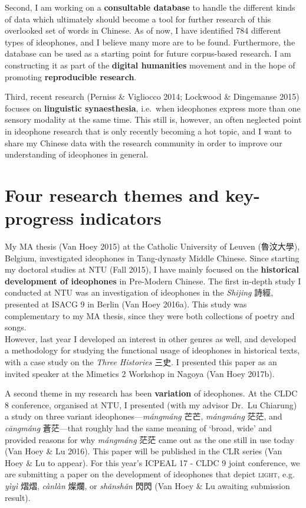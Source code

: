 \documentclass[12pt,]{article}
\theoremstyle{definition}
\theoremstyle{definition}
\theoremstyle{definition}
\theoremstyle{remark}
\begin{document}
Second, I am working on a \textbf{consultable database} to handle the
different kinds of data which ultimately should become a tool for
further research of this overlooked set of words in Chinese. As of now,
I have identified 784 different types of ideophones, and I believe many
more are to be found. Furthermore, the database can be used as a
starting point for future corpus-based research. I am constructing it as
part of the \textbf{digital humanities} movement and in the hope of
promoting \textbf{reproducible research}.

Third, recent research (Perniss \& Vigliocco 2014; Lockwood \&
Dingemanse 2015) focuses on \textbf{linguistic synaesthesia}, i.e.~when
ideophones express more than one sensory modality at the same time. This
still is, however, an often neglected point in ideophone research that
is only recently becoming a hot topic, and I want to share my Chinese
data with the research community in order to improve our understanding
of ideophones in general.

\section{Four research themes and key-progress
indicators}\label{four-research-themes-and-key-progress-indicators}

My MA thesis (Van Hoey 2015) at the Catholic University of Leuven
(魯汶大學), Belgium, investigated ideophones in Tang-dynasty Middle
Chinese. Since starting my doctoral studies at NTU (Fall 2015), I have
mainly focused on the \textbf{historical development of ideophones} in
Pre-Modern Chinese. The first in-depth study I conducted at NTU was an
investigation of ideophones in the \emph{Shijing} 詩經, presented at
ISACG 9 in Berlin (Van Hoey 2016a). This study was complementary to my
MA thesis, since they were both collections of poetry and songs.\\
However, last year I developed an interest in other genres as well, and
developed a methodology for studying the functional usage of ideophones
in historical texts, with a case study on the \emph{Three Histories}
三史. I presented this paper as an invited speaker at the Mimetics 2
Workshop in Nagoya (Van Hoey 2017b).

A second theme in my research has been \textbf{variation} of ideophones.
At the CLDC 8 conference, organised at NTU, I presented (with my advisor
Dr.~Lu Chiarung) a study on three variant ideophones---\emph{mángmáng}
芒芒, \emph{mángmáng} 茫茫, and \emph{cāngmáng} 蒼茫---that roughly had
the same meaning of `broad, wide' and provided reasons for why
\emph{mángmáng} 茫茫 came out as the one still in use today (Van Hoey \&
Lu 2016). This paper will be published in the CLR series (Van Hoey \& Lu
to appear). For this year's ICPEAL 17 - CLDC 9 joint conference, we are
submitting a paper on the development of ideophones that depict
\textsc{light}, e.g. \emph{yìyì} 熠熠, \emph{cànlàn} 燦爛, or
\emph{shǎnshǎn} 閃閃 (Van Hoey \& Lu awaiting submission result).
\end{document}
